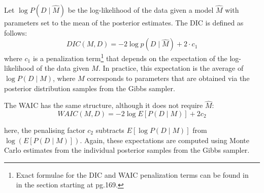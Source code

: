\documentclass[letterpaper]{article} %
\newcommand{\citename}[1]{\citeauthor{#1}~\shortcite{#1}}
\begin{document}
Let $ \log P( D \mid \hat{M} )$ be the log-likelihood of the data given a model $\hat{M}$ with parameters set to the mean of the posterior estimates. The DIC is defined as follows:
\begin{equation}
    \label{eq:dic_formula}
    DIC (M, D) = -2 \log p(D \mid \hat{M}) + 2\cdot c_1
\end{equation}
where $c_1$ is a penalization term\footnote{Exact formulae for the DIC and WAIC penalization terms can be found in \citename{gelman2013bayesian} in the section starting at pg.169.} that depends on 
the expectation of the log-likelihood of the data given $M$.  In practice, this expectation is the average of $\log P(D\mid M)$, where $M$ corresponds to parameters that are obtained via the posterior distribution samples from the Gibbs sampler. 
 
The WAIC has the same structure, although it does not require $\hat{M}$:
\begin{equation}
    \label{eq:waic_formula}
    WAIC (M ,D) = - 2 \log E[ P( D \mid M ) ] + 2c_2
\end{equation}

\noindent here, the penalising factor $c_2$  
subtracts $E[ \log P (D \mid M )]$ from $\log\left( E[ P ( D \mid M )]\right)$. 
Again, these expectations are computed using Monte Carlo estimates from the individual posterior samples from the Gibbs sampler. 
\end{document}
